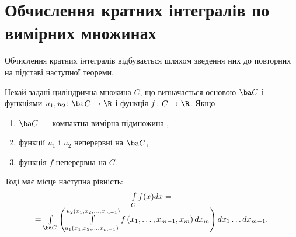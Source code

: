 \section{Обчислення кратних інтегралів по вимірних множинах}
Обчислення кратних інтегралів відбувається шляхом зведення них до повторних на підставі наступної теореми.
\begin{theorem}
Нехай задані циліндрична множина $C$, що визначається основою $\ba C$ і функціями ${u_1, u_2\colon \ba C\to \R}$ і функція $f\colon C\to \R$. Якщо
\begin{enumerate}
\item $\ba C$ --- компактна вимірна підмножина ,
\item функції $u_1$ і $u_2$ неперервні на $\ba C$,
\item функція $f$ неперервна на $C$.
\end{enumerate}
Тоді має місце наступна рівність:
\[
\begin{array}{c}
\int\limits_C f(x)d x = \\
 =\int\limits_{\ba C}\left( \int\limits_{u_1\left(x_1, x_2,\ldots, x_{m-1}\right)}^{u_2\left(x_1, x_2,\ldots, x_{m-1}\right)} f\left(x_1, \ldots, x_{m-1}, x_m \right)d x_m\right) d x_1 \ldots  d x_{m-1}.
\end{array}
\]
\end{theorem}
